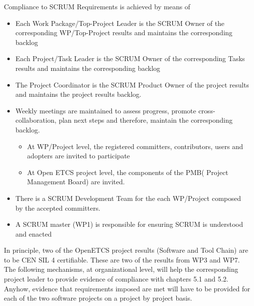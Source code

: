 \documentclass{template/openetcs_article}
\begin{document}
Compliance to SCRUM Requirements is achieved by means of
\begin{itemize}
\item Each Work Package/Top-Project Leader is the SCRUM Owner of the corresponding WP/Top-Project results and maintains the corresponding backlog
\item Each Project/Task Leader is the SCRUM Owner of the corresponding Tasks results  and maintains the corresponding backlog
\item The Project Coordinator is the SCRUM Product Owner of the project results and maintains the project results backlog.
\item Weekly meetings are maintained to assess progress, promote cross-collaboration, plan next steps and therefore, maintain the corresponding backlog.
\begin{itemize}
\item At WP/Project level, the registered committers, contributors, users and adopters are invited to participate
\item At Open ETCS project level, the components of the PMB( Project Management Board) are invited.
\end{itemize} 
\item There is a SCRUM Development Team for the each WP/Project composed by the accepted committers.
\item A SCRUM master (WP1) is responsible for ensuring SCRUM is understood and enacted
\end{itemize}

In principle, two of the OpenETCS project results (Software and Tool Chain) are to be CEN SIL 4 certifiable. These are two of the results from WP3 and WP7. The following mechanisms, at organizational level, will help the corresponding project leader to provide evidence of compliance with chapters 5.1 \citep{EN50128} and 5.2. Anyhow, evidence that requirements imposed are met will have to be provided for each of the two software projects on a project by project basis. 
\end{document}
